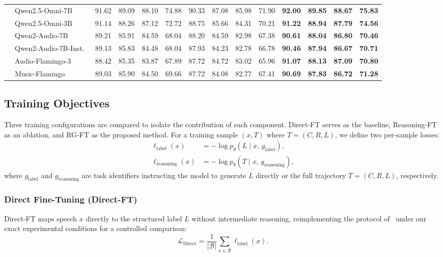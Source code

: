 \documentclass[cameraready]{Interspeech}
\begin{document}
\begin{table}[t]
{\begin{tabular}{llcccccccccccc}
 & Qwen2.5-Omni-7B~\cite{xu2025qwen25omni} & 91.62 & 89.09 & 88.10 & 74.88 & 90.33 & 87.08 & 85.98 & 71.90 & \textbf{92.00} & \textbf{89.85} & \textbf{88.67} & \textbf{75.83} \\
 & Qwen2.5-Omni-3B~\cite{xu2025qwen25omni} & 91.14 & 88.26 & 87.12 & 72.72 & 88.75 & 85.66 & 84.31 & 70.21 & \textbf{91.22} & \textbf{88.94} & \textbf{87.79} & \textbf{74.56} \\
 & Qwen2-Audio-7B~\cite{chu2024qwen2} & 89.21 & 85.91 & 84.59 & 68.04 & 88.20 & 84.59 & 82.98 & 67.38 & \textbf{90.61} & \textbf{88.04} & \textbf{86.80} & \textbf{70.46} \\
 & Qwen2-Audio-7B-Inst.~\cite{chu2024qwen2} & 89.13 & 85.83 & 84.48 & 68.04 & 87.93 & 84.23 & 82.78 & 66.78 & \textbf{90.46} & \textbf{87.94} & \textbf{86.67} & \textbf{70.71} \\
 & Audio-Flamingo-3~\cite{goel2025audioflamingo3} & 88.42 & 85.35 & 83.87 & 67.89 & 87.72 & 84.72 & 83.02 & 65.96 & \textbf{91.07} & \textbf{88.13} & \textbf{87.09} & \textbf{70.80} \\
 & Music-Flamingo~\cite{ghosh2025musicflamingoscalingmusic} & 89.03 & 85.90 & 84.50 & 69.66 & 87.72 & 84.08 & 82.77 & 67.41 & \textbf{90.69} & \textbf{87.83} & \textbf{86.72} & \textbf{71.28} \\
\hline
\end{tabular}
}
\end{table}






\subsection{Training Objectives}
Three training configurations are compared to isolate the contribution
of each component. Direct-FT serves as the baseline, Reasoning-FT as
an ablation, and RG-FT as the proposed method.
For a training sample $(x, T)$ where $T = (C, R, L)$, we define two
per-sample losses:
\begin{align}
  \ell_{\text{label}}(x)
    &= -\log p_\theta\!\left(L \mid x,\, g_{\text{label}}\right), \\
  \ell_{\text{reasoning}}(x)
    &= -\log p_\theta\!\left(T \mid x,\, g_{\text{reasoning}}\right),
\end{align}
where $g_{\text{label}}$ and $g_{\text{reasoning}}$ are task identifiers
instructing the model to generate $L$ directly or the full trajectory
$T = (C, R, L)$, respectively.

\subsubsection{Direct Fine-Tuning (Direct-FT)}
Direct-FT maps speech $x$ directly to the structured label $L$ without
intermediate reasoning, reimplementing the protocol
of~\cite{choi2025exploring} under our exact experimental conditions for
a controlled comparison:
\begin{equation}
  \mathcal{L}_{\text{Direct}}
  = \frac{1}{|\mathcal{B}|}
    \sum_{x \in \mathcal{B}} \ell_{\text{label}}(x).
\end{equation}
\end{document}
